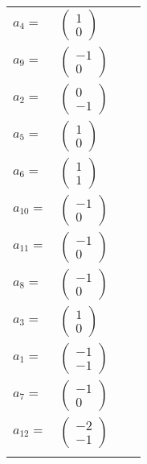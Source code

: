 \documentclass[1p]{elsarticle_modified}
\theoremstyle{definition}
\begin{document}
\begin{tabular}{m{7pt} m{180pt} m{7pt} m{180pt} }
\flushright $a_{4}=$&$\begin{pmatrix}1\\0\end{pmatrix}$ \\
\flushright $a_{9}=$&$\begin{pmatrix}-1\\0\end{pmatrix}$ \\
\flushright $a_{2}=$&$\begin{pmatrix}0\\-1\end{pmatrix}$ \\
\flushright $a_{5}=$&$\begin{pmatrix}1\\0\end{pmatrix}$ \\
\flushright $a_{6}=$&$\begin{pmatrix}1\\1\end{pmatrix}$ \\
\flushright $a_{10}=$&$\begin{pmatrix}-1\\0\end{pmatrix}$ \\
\flushright $a_{11}=$&$\begin{pmatrix}-1\\0\end{pmatrix}$ \\
\flushright $a_{8}=$&$\begin{pmatrix}-1\\0\end{pmatrix}$ \\
\flushright $a_{3}=$&$\begin{pmatrix}1\\0\end{pmatrix}$ \\
\flushright $a_{1}=$&$\begin{pmatrix}-1\\-1\end{pmatrix}$ \\
\flushright $a_{7}=$&$\begin{pmatrix}-1\\0\end{pmatrix}$ \\
\flushright $a_{12}=$&$\begin{pmatrix}-2\\-1\end{pmatrix}$\\&\end{tabular}
\end{document}
